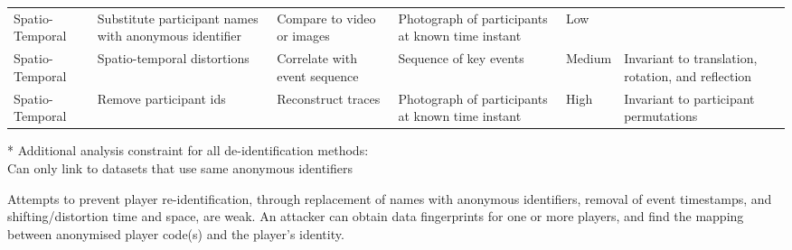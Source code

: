 \begin{table}[h]
\begin{tabular}{L{1.5cm}L{2.5cm}L{2.1cm}L{2.5cm}L{1.5cm}L{1.8cm}}
\rule{0pt}{4ex} %
Spatio- Temporal & Substitute participant names with anonymous identifier  & Compare to video or images                     & Photograph of participants at known time instant & Low &                                                                  \\
\rule{0pt}{4ex} %
Spatio- Temporal & Spatio-temporal distortions                             & Correlate with event sequence        & Sequence of key events                           & Medium & Invariant to translation, rotation, and reflection            \\
\rule{0pt}{4ex} %
Spatio- Temporal & Remove participant ids                                  & Reconstruct traces                   & Photograph of participants at known time instant & High & Invariant to participant permutations              
\end{tabular}

\vspace{1em}

* Additional analysis constraint for all de-identification methods:\\
Can only link to datasets that use same anonymous identifiers
\end{table}


Attempts to prevent player re-identification, through replacement of names with anonymous identifiers, removal of event timestamps, and shifting/distortion time and space, are weak. An attacker can obtain data fingerprints for one or more players, and find the mapping between anonymised player code(s) and the player's identity.

